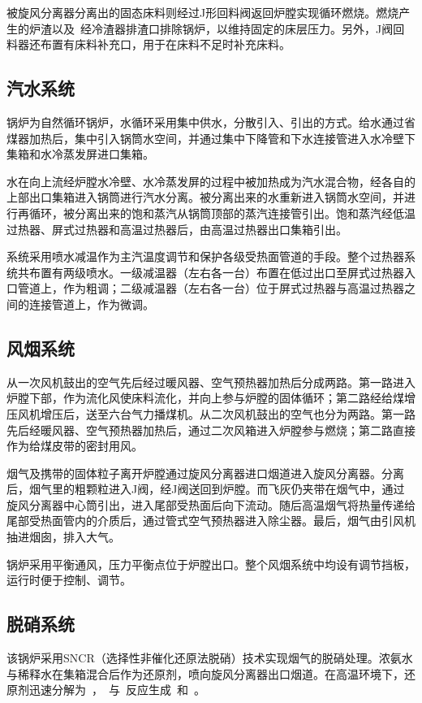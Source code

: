 被旋风分离器分离出的固态床料则经过J形回料阀返回炉膛实现循环燃烧。燃烧产生的炉渣以及~经冷渣器排渣口排除锅炉，以维持固定的床层压力。另外，J阀回料器还布置有床料补充口，用于在床料不足时补充床料。


\subsection{汽水系统}

锅炉为自然循环锅炉，水循环采用集中供水，分散引入、引出的方式。给水通过省煤器加热后，集中引入锅筒水空间，并通过集中下降管和下水连接管进入水冷壁下集箱和水冷蒸发屏进口集箱。

水在向上流经炉膛水冷壁、水冷蒸发屏的过程中被加热成为汽水混合物，经各自的上部出口集箱进入锅筒进行汽水分离。被分离出来的水重新进入锅筒水空间，并进行再循环，被分离出来的饱和蒸汽从锅筒顶部的蒸汽连接管引出。饱和蒸汽经低温过热器、屏式过热器和高温过热器后，由高温过热器出口集箱引出。

系统采用喷水减温作为主汽温度调节和保护各级受热面管道的手段。整个过热器系统共布置有两级喷水。一级减温器（左右各一台）布置在低过出口至屏式过热器入口管道上，作为粗调；二级减温器（左右各一台）位于屏式过热器与高温过热器之间的连接管道上，作为微调。


\subsection{风烟系统}

从一次风机鼓出的空气先后经过暖风器、空气预热器加热后分成两路。第一路进入炉膛下部，作为流化风使床料流化，并向上参与炉膛的固体循环；第二路经给煤增压风机增压后，送至六台气力播煤机。从二次风机鼓出的空气也分为两路。第一路先后经暖风器、空气预热器加热后，通过二次风箱进入炉膛参与燃烧；第二路直接作为给煤皮带的密封用风。

烟气及携带的固体粒子离开炉膛通过旋风分离器进口烟道进入旋风分离器。分离后，烟气里的粗颗粒进入J阀，经J阀送回到炉膛。而飞灰仍夹带在烟气中，通过旋风分离器中心筒引出，进入尾部受热面后向下流动。随后高温烟气将热量传递给尾部受热面管内的介质后，通过管式空气预热器进入除尘器。最后，烟气由引风机抽进烟囱，排入大气。

锅炉采用平衡通风，压力平衡点位于炉膛出口。整个风烟系统中均设有调节挡板，运行时便于控制、调节。

\subsection{脱硝系统}

该锅炉采用SNCR（选择性非催化还原法脱硝）技术实现烟气的脱硝处理。浓氨水与稀释水在集箱混合后作为还原剂，喷向旋风分离器出口烟道。在高温环境下，还原剂迅速分解为~，~与~反应生成~和~。

